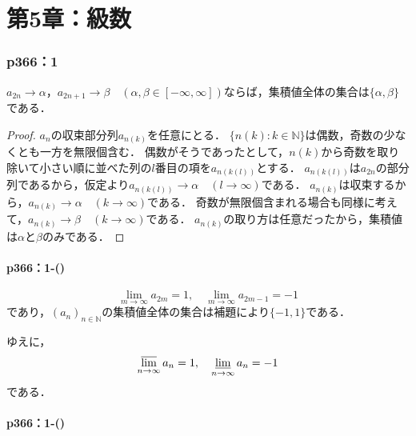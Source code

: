 
\part*{第5章：級数}


\section*{p366：1}

\begin{lemma}{}{}
    $a_{2n} \to \alpha$，$a_{2n+1} \to \beta$$\quad (\alpha,\beta \in [-\infty,\infty])$ならば，集積値全体の集合は$\{\alpha,\beta\}$である．
\end{lemma}
\begin{proof}
    $a_n$の収束部分列$a_{n(k)}$を任意にとる．
    $\{n(k):k \in \mathbb{N}\}$は偶数，奇数の少なくとも一方を無限個含む．
    偶数がそうであったとして，$n(k)$から奇数を取り除いて小さい順に並べた列の$l$番目の項を$a_{n(k(l))}$とする．
    $a_{n(k(l))}$は$a_{2n}$の部分列であるから，仮定より$a_{n(k(l))} \to \alpha \quad (l \to \infty)$である．
    $a_{n(k)}$は収束するから，$a_{n(k)} \to \alpha \quad (k \to \infty)$である．
    奇数が無限個含まれる場合も同様に考えて，$a_{n(k)} \to \beta \quad (k \to \infty)$である．
    $a_{n(k)}$の取り方は任意だったから，集積値は$\alpha$と$\beta$のみである．
\end{proof}

\subsection*{p366：1-()}

\begin{tanswer}
    \[
        \lim_{m \to \infty} a_{2m} = 1 , \quad \lim_{m \to \infty} a_{2m-1} = -1
    \]
    であり，$(a_n)_{n \in \mathbb{N}}$の集積値全体の集合は補題により$\{ -1 , 1 \}$である．

    ゆえに，
    \[
        \varlimsup_{n \to \infty} a_n = 1 , \quad \varliminf_{n \to \infty} a_n =-1
    \]
    である．
\end{tanswer}


\subsection*{p366：1-()}

